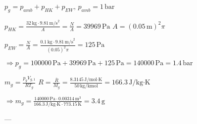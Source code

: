 \( p_{g} = p_{amb} + p_{HK} + p_{EW}, \, p_{amb} = 1 \, \text{bar} \)  

\( p_{HK} = \frac{32 \, \text{kg} \cdot 9.81 \, \text{m/s}^2}{A} = \frac{N}{A} = 39969 \, \text{Pa} \)  
\( A = (0.05 \, \text{m})^2 \pi \)  

\( p_{EW} = \frac{N}{A} = \frac{0.1 \, \text{kg} \cdot 9.81 \, \text{m/s}^2}{(0.05)^2 \pi} = 125 \, \text{Pa} \)  

\( \Rightarrow p_{g} = 100000 \, \text{Pa} + 39969 \, \text{Pa} + 125 \, \text{Pa} = 140000 \, \text{Pa} = 1.4 \, \text{bar} \)  

\( m_{g} = \frac{p_{g} V_{g,1}}{R T_{g}} \)  
\( R = \frac{\bar{R}}{M_{g}} = \frac{8.3145 \, \text{J/mol·K}}{50 \, \text{kg/kmol}} = 166.3 \, \text{J/kg·K} \)  

\( \Rightarrow m_{g} = \frac{140000 \, \text{Pa} \cdot 0.00314 \, \text{m}^3}{166.3 \, \text{J/kg·K} \cdot 773.15 \, \text{K}} = 3.4 \, \text{g} \)  

---